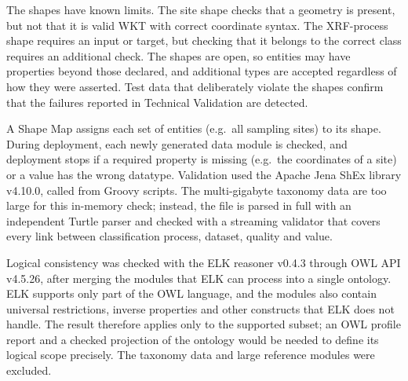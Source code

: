 \begin{revision}
The shapes have known limits. The site shape checks that a geometry is
present, but not that it is valid WKT with correct coordinate syntax. The
XRF-process shape requires an input or target, but checking that it
belongs to the correct class requires an additional check. The shapes are
open, so entities may have properties beyond those declared, and
additional types are accepted regardless of how they were asserted. Test
data that deliberately violate the shapes confirm that the failures
reported in Technical Validation are detected.

A Shape Map assigns each set of entities (e.g.\ all sampling sites) to its
shape. During deployment, each newly generated data module is checked, and
deployment stops if a required property is missing (e.g.\ the coordinates
of a site) or a value has the wrong datatype. Validation used the Apache
Jena ShEx library v4.10.0, called from Groovy scripts. The multi-gigabyte
taxonomy data are too large for this in-memory check; instead, the file is
parsed in full with an independent Turtle parser and checked with a
streaming validator that covers every link between classification
process, dataset, quality and value.

Logical consistency was checked with the ELK reasoner v0.4.3 \cite{elk}
through OWL API v4.5.26, after merging the modules that ELK can process
into a single ontology. ELK supports only part of the OWL language, and
the modules also contain universal restrictions, inverse properties and
other constructs that ELK does not handle. The result therefore applies
only to the supported subset; an OWL profile report and a checked
projection of the ontology would be needed to define its logical scope
precisely. The taxonomy data and large reference modules were excluded.
\end{revision}
